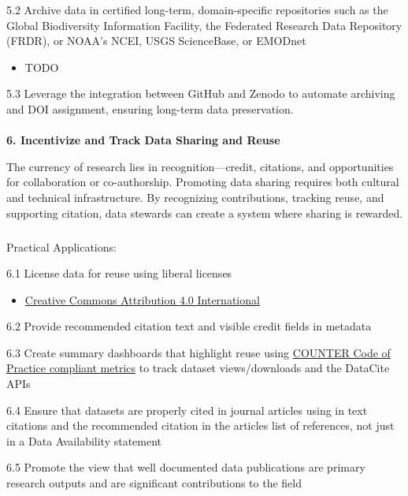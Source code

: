 \documentclass[
  letterpaper,
  DIV=11,
  numbers=noendperiod]{scrartcl}
\makeatletter
\let\oldparagraph\paragraph
\renewcommand{\paragraph}{
    \@ifstar
      \xxxParagraphStar
      \xxxParagraphNoStar
  }
\newcommand{\xxxParagraphStar}[1]{\oldparagraph*{#1}\mbox{}}
\newcommand{\xxxParagraphNoStar}[1]{\oldparagraph{#1}\mbox{}}
\let\oldsubparagraph\subparagraph
\renewcommand{\subparagraph}{
    \@ifstar
      \xxxSubParagraphStar
      \xxxSubParagraphNoStar
  }
\newcommand{\xxxSubParagraphStar}[1]{\oldsubparagraph*{#1}\mbox{}}
\newcommand{\xxxSubParagraphNoStar}[1]{\oldsubparagraph{#1}\mbox{}}
\providecommand{\tightlist}{%
  \setlength{\itemsep}{0pt}\setlength{\parskip}{0pt}}\usepackage{longtable,booktabs,array}
\makeatother
\begin{document}
5.2 Archive data in certified long-term, domain-specific repositories
such as the Global Biodiversity Information Facility, the Federated
Research Data Repository (FRDR), or NOAA's NCEI, USGS ScienceBase, or
EMODnet

\begin{itemize}
\tightlist
\item
  TODO
\end{itemize}

5.3 Leverage the integration between GitHub and Zenodo to automate
archiving and DOI assignment, ensuring long-term data preservation.

\paragraph{\texorpdfstring{\textbf{6. Incentivize and Track Data Sharing
and
Reuse}}{6. Incentivize and Track Data Sharing and Reuse}}\label{incentivize-and-track-data-sharing-and-reuse}

The currency of research lies in recognition---credit, citations, and
opportunities for collaboration or co-authorship. Promoting data sharing
requires both cultural and technical infrastructure. By recognizing
contributions, tracking reuse, and supporting citation, data stewards
can create a system where sharing is rewarded.

\subparagraph{Practical Applications:}\label{practical-applications-5}

6.1 License data for reuse using liberal licenses

\begin{itemize}
\tightlist
\item
  \href{https://creativecommons.org/licenses/by/4.0/deed.en}{Creative
  Commons Attribution 4.0 International}
\end{itemize}

6.2 Provide recommended citation text and visible credit fields in
metadata

6.3 Create summary dashboards that highlight reuse using
\href{https://www.countermetrics.org/}{COUNTER Code of Practice
compliant metrics} to track dataset views/downloads and the DataCite
APIs

6.4 Ensure that datasets are properly cited in journal articles using in
text citations and the recommended citation in the articles list of
references, not just in a Data Availability statement

6.5 Promote the view that well documented data publications are primary
research outputs and are significant contributions to the field
\end{document}
